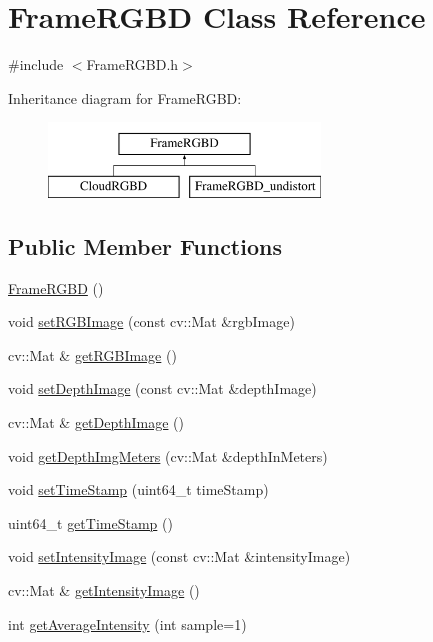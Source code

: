 \hypertarget{classFrameRGBD}{\section{\-Frame\-R\-G\-B\-D \-Class \-Reference}
\label{classFrameRGBD}
}


{\ttfamily \#include $<$\-Frame\-R\-G\-B\-D.\-h$>$}

\-Inheritance diagram for \-Frame\-R\-G\-B\-D\-:\begin{figure}[H]
\begin{center}
\leavevmode
\includegraphics[height=2.000000cm]{classFrameRGBD}
\end{center}
\end{figure}
\subsection*{\-Public \-Member \-Functions}
\begin{DoxyCompactItemize}
\item 
\hyperlink{classFrameRGBD_af119351e5657ecad6415ab585042f0f2}{\-Frame\-R\-G\-B\-D} ()
\item 
void \hyperlink{classFrameRGBD_a5bae4e6cb40faa2b8bd8a1585b0075e0}{set\-R\-G\-B\-Image} (const cv\-::\-Mat \&rgb\-Image)
\item 
cv\-::\-Mat \& \hyperlink{classFrameRGBD_affbab8a5cabe247b73564cb5d42ebc0c}{get\-R\-G\-B\-Image} ()
\item 
void \hyperlink{classFrameRGBD_a9c97b2d53c64ac2339c9a9e7bc4076c2}{set\-Depth\-Image} (const cv\-::\-Mat \&depth\-Image)
\item 
cv\-::\-Mat \& \hyperlink{classFrameRGBD_a7cffa0f358f8d57f87988740c63c5bdc}{get\-Depth\-Image} ()
\item 
void \hyperlink{classFrameRGBD_aeee788a48f17bc4ffa2a1e627d4562a7}{get\-Depth\-Img\-Meters} (cv\-::\-Mat \&depth\-In\-Meters)
\item 
void \hyperlink{classFrameRGBD_accac14d7b2f4c11f1915d4dc464854d2}{set\-Time\-Stamp} (uint64\-\_\-t time\-Stamp)
\item 
uint64\-\_\-t \hyperlink{classFrameRGBD_af60a0b41c662cd2a0847ac1b20209b07}{get\-Time\-Stamp} ()
\item 
void \hyperlink{classFrameRGBD_aa4df44d7422de398e0769da2c3746bc9}{set\-Intensity\-Image} (const cv\-::\-Mat \&intensity\-Image)
\item 
cv\-::\-Mat \& \hyperlink{classFrameRGBD_a31aee8d47eb70ea0eb43c16ba647603e}{get\-Intensity\-Image} ()
\item 
int \hyperlink{classFrameRGBD_a2e5b3a2bfca2f0c5839a2b55dfd217db}{get\-Average\-Intensity} (int sample=1)
\end{DoxyCompactItemize}
